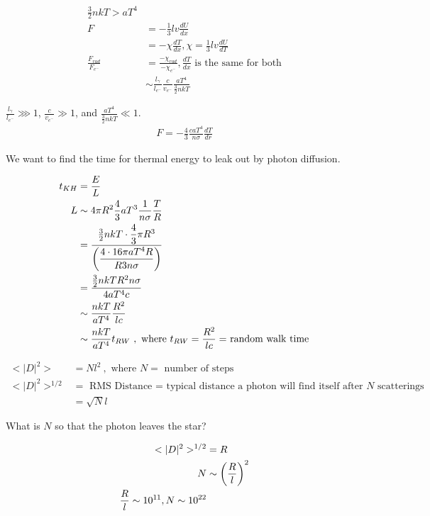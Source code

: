 \begin{align}
\frac{3}{2}nkT > aT^4\\
F &= -\frac{1}{3}lv \frac{dU}{dx}\\
&= -\chi \frac{dT}{dx},\chi = \frac{1}{3}lv \frac{dU}{dT}\\
\frac{F_{rad}}{F_{e^-}} &= \frac{-\chi_{rad}}{-\chi_{e^-}}, \frac{dT}{dx}\text{ is the same for both}\\
&\sim \frac{l_\gamma}{l_{e^-} }\frac{ c}{v_{e^-} }\frac{aT^4}{\frac{3}{2}nkT}
\end{align}

$ \frac{l_\gamma}{l_{e^-} } \ggg 1$, $\frac{ c}{v_{e^-}} \gg 1$, and $\frac{aT^4}{\frac{3}{2}nkT} \ll 1$.\\

\begin{align}
F = -\frac{4}{3}\frac{caT^4}{n \sigma} \frac{dT}{dr}
\end{align}

We want to find the time for thermal energy to leak out by photon diffusion.

\begin{align}
t_{KH} &= \frac{E}{L}\\
L &\sim 4 \pi R^2 \frac{4}{3}aT^3 \frac{1}{n\sigma}\frac{T}{R}\\
&= \frac{\frac{3}{2}nkT \cdot \dfrac{4}{3}\pi R^3}{ \left( \dfrac{4 \cdot 16 \pi aT^4R}{R3n\sigma} \right)}\\
&=\frac{\frac{3}{2}nkTR^2n\sigma}{4aT^4c}\\
&\sim \frac{nkT}{aT^4}\frac{R^2}{lc}\\
&\sim \frac{nkT}{aT^4}t_{RW}~,\text{ where $t_{RW}=\frac{R^2}{lc}=$ random walk time}
\end{align}

\begin{align}
<|D|^2>&=Nl^2~,\text{ where $N = $ number of steps}\\
<|D|^2>^{1/2} &= \text{ RMS Distance = typical distance a photon will find itself after $N$ scatterings}\\
&= \sqrt{N}l
\end{align}

What is $N$ so that the photon leaves the star?

\begin{align}
<|D|^2>^{1/2} &=R\\
N &\sim \lp \frac{R}{l} \rp^2\\
\frac{R}{l} \sim 10^{11},N\sim 10^{22}
\end{align}

